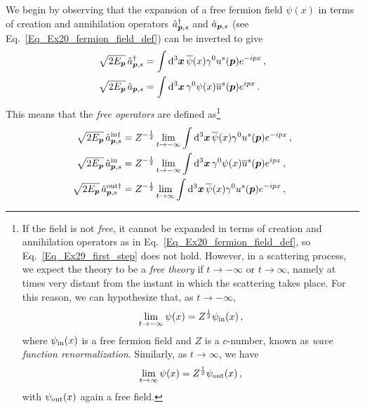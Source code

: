 \begin{sol}
    We begin by observing that the expansion of a free fermion field $\psi(x)$ in terms of creation and annihilation operators $\hat{a}^\dagger_{\boldsymbol{p},s}$ and $\hat{a}_{\boldsymbol{p},s}$ (see Eq.~\eqref{Eq_Ex20_fermion_field_def}) can be inverted to give
    \begin{equation} \label{Eq_Ex29_first_step}
        \begin{split}
            \sqrt{2 E_{\boldsymbol{p}}} \, \hat{a}^\dagger_{\boldsymbol{p},s} & = \int {\rm d}^3 \boldsymbol{x} \,\overline{\psi}(x) \gamma^0 u^s(\boldsymbol{p}) e^{-ipx} \,,\\
            \sqrt{2 E_{\boldsymbol{p}}} \, \hat{a}_{\boldsymbol{p}, s} & = \int {\rm d}^3 \boldsymbol{x} \, \gamma^0 \psi(x) \overline{u}^s(\boldsymbol{p}) e^{ipx}\,.
        \end{split}
    \end{equation}
    This means that the \emph{free operators} are defined as\footnote{If the field is not \emph{free}, it cannot be expanded in terms of creation and annihilation operators as in Eq.~\eqref{Eq_Ex20_fermion_field_def}, so Eq.~\eqref{Eq_Ex29_first_step} does not hold. However, in a scattering process, we expect the theory to be a \emph{free theory} if $t \to -\infty$ or $t \to \infty$, namely at times very distant from the instant in which the scattering takes place. For this reason, we can hypothesize that, as $t \to -\infty$, 
    \begin{equation}
        \lim_{t \to -\infty}\psi(x) = Z^{\frac{1}{2}} \psi_{\rm in}(x) \, ,
    \end{equation}
    where $\psi_{\rm in}(x)$ is a free fermion field and $Z$ is a $c$-number, known as \emph{wave function renormalization}. Similarly, as $t \to \infty$, we have
    \begin{equation}
        \lim_{t \to \infty}\psi(x) = Z^{\frac{1}{2}} \psi_{\rm out}(x) \, ,
    \end{equation}
    with $\psi_{\rm out}(x)$ again a free field.
    }
    \begin{align}
            \sqrt{2 \Ep} \, \aincon_{\vp, s} & = Z^{-\frac{1}{2}} \lim_{t\rightarrow - \infty} \int \rmd^3 \vx \,\sbar{\psi}(x) \gamma^0 u^s(\vp) e^{-ipx} \label{ain_dag}\,,\\
            \sqrt{2 \Ep} \, \aindes_{\vp, s}& = Z^{-\frac{1}{2}} \lim_{t\rightarrow - \infty}\int \rmd^3 \vx \, \gamma^0 \psi(x) \sbar{u}^s(\vp) e^{ipx} \label{ain}\,,\\
            \sqrt{2 \Ep} \, \aoutcon_{\vp, s} & = Z^{-\frac{1}{2}} \lim_{t\rightarrow \infty} \int \rmd^3 \vx \,\sbar{\psi}(x) \gamma^0 u^s(\vp) e^{-ipx} \label{aout_dag}\,,\\

\end{align}
\end{sol}
